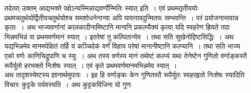 \documentclass[11pt, openany]{book}
\begin{document}
\begin{sloppypar}
तदेतत् उक्तम् आद्यभक्ते पक्षेऽन्यस्मिन्नाद्यवर्णोन्मितिः स्यात् इति~। एवं प्रथमतृतीययोः प्रथमचतुर्थयोर्द्वितीयचतुर्थयोश्च समशोधनेनान्या अपि यावत्तावदुन्मितयः सम्भवन्ति~। परं प्रयोजनाभावान्न कृताः~। अथ भाज्यवर्णानां कालकादीनामिष्टानि मानानि प्रकल्प्यैक्यं कृत्वा यदि स्वहरेण ह्रियते तदा भिन्नमभिन्नं वा प्रथमवर्णमानं स्यात्~। इतरेषां तु कल्पितान्येव~। तथा सति सुखेनोद्दिष्टसिद्धिः~। अथ यद्यभिन्नमेव मानमपेक्षितं तर्हि यं कञ्चिदेकं वर्णं विहाय परेषां मानानीष्टानि कल्प्यानि~। तथा सति भाज्य एको वर्णः कानिचिद्रूपाणि च स्युः~। अथ तस्य वर्णस्य मानं तथेष्टं कल्प्यं यथा तेनेष्टेन गुणितो वर्णाङ्कस्तै रूपैर्युतो हरभक्तो निःशेषः स्यात्~। एवं कृते प्रथमवर्णमानमभिन्नमेव स्यात्~।\\

अथ तादृशस्येष्टस्य ज्ञानार्थमुपायः~। इह हि वर्णाङ्कः केन गुणितस्तै रूपैर्युतः स्वहरहृतो निःशेषः स्यादिति विचारः कुट्टके पर्यवस्यति~। अथ कुट्टकविधिना यो गुणः
\end{sloppypar}

\newpage
\end{document}
